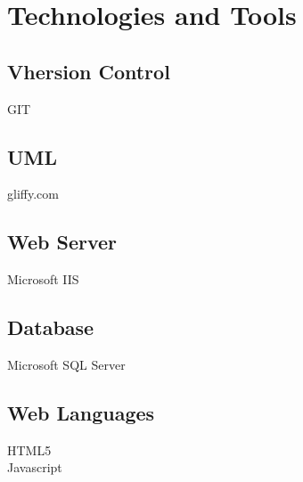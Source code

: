 \documentclass[11pt,a4paper,oneside]{article}
\begin{document}
\section{Technologies and Tools}
\subsection{Vhersion Control}
GIT\\

\subsection{UML}
gliffy.com\\

\subsection{Web Server}
Microsoft IIS\\

\subsection{Database}
Microsoft SQL Server\\

\subsection{Web Languages}
HTML5\\
Javascript\\
\end{document}

